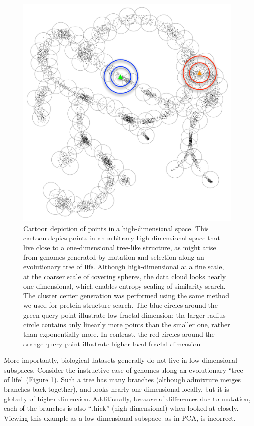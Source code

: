 \documentclass[review,preprint,12pt]{elsarticle}
\theoremstyle{definition}
\theoremstyle{remark}
\numberwithin{equation}{section}
\begin{document}
\begin{figure}[p]
    \vspace{-5em}
    \centering
    \centerline{\includegraphics[width=8in]{assets/treepoints/treepoints-2D-clusters-conc.pdf}}
    \caption{Cartoon depiction of points in a high-dimensional space. %
        This cartoon depics points in an arbitrary high-dimensional space that live close to a one-dimensional tree-like structure, as might arise from genomes generated by mutation and selection along an evolutionary tree of life. %
Although high-dimensional at a fine scale, at the coarser scale of covering spheres, the data cloud looks nearly one-dimensional, which enables entropy-scaling of similarity search. The cluster center generation was performed using the same method we used for protein structure search. %
The blue circles around the green query point illustrate low fractal dimension: the larger-radius circle contains only linearly more points than the smaller one, rather than exponentially more. In contrast, the red circles around the orange query point illustrate higher local fractal dimension.}
    \label{fig:tree}
\end{figure}

More importantly, biological datasets generally do not live in low-dimensional subspaces.
Consider the instructive case of genomes along an evolutionary ``tree of life'' (Figure \ref{fig:tree}).
Such a tree has many branches (although admixture merges branches back together),
and looks nearly one-dimensional locally, but it is globally of higher dimension.
Additionally, because of differences due to mutation, each of the branches is also ``thick'' (high dimensional) when looked at closely.
Viewing this example as a low-dimensional subspace, as in PCA, is 
incorrect.
\end{document}
